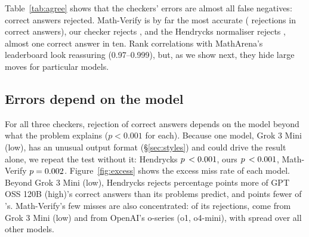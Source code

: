 \documentclass[11pt]{article}
\begin{document}
Table~\ref{tab:agree} shows that the checkers' errors are almost all false negatives: correct answers rejected. Math-Verify is by far the most accurate (\mathverifyFN{} rejections in \maCorrect{} correct answers), our checker rejects \oursFN{}, and the Hendrycks normaliser rejects \hendrycksFN{}, almost one correct answer in ten. Rank correlations with MathArena's leaderboard look reassuring (0.97--0.999), but, as we show next, they hide large moves for particular models.

\subsection{Errors depend on the model}\label{sec:diff}

For all three checkers, rejection of correct answers depends on the model beyond what the problem explains ($p<0.001$ for each).
Because one model, Grok 3 Mini (low), has an unusual output format (\S\ref{sec:styles}) and could drive the result alone, we repeat the test without it: Hendrycks $p\,<0.001$, ours $p\,<0.001$, Math-Verify $p=0.002$.
Figure~\ref{fig:excess} shows the excess miss rate of each model.
Beyond Grok 3 Mini (low), Hendrycks rejects \henGptOss{} percentage points more of GPT OSS 120B (high)'s correct answers than its problems predict, and \henLowExcess{} points fewer of \henLowExcessModel's.
Math-Verify's few misses are also concentrated: of its \mathverifyFN{} rejections, \mvMissGrok{} come from Grok 3 Mini (low) and \mvMissOseries{} from OpenAI's o-series (o1, o4-mini), with \mvMissOther{} spread over all other models.
\end{document}

